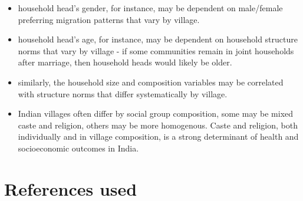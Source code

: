 \documentclass[12pt]{article}
\begin{document}
\begin{itemize}
    \item household head's gender, for instance, may be dependent on male/female preferring migration patterns that vary by village.

    \item household head's age, for instance, may be dependent on household structure norms that vary by village - if some communities remain in joint households after marriage, then household heads would likely be older. 

    \item similarly, the household size and composition variables may be correlated with structure norms that differ systematically by village.
    
    \item Indian villages often differ by social group composition, some may be mixed caste and religion, others may be more homogenous. Caste and religion, both individually and in village composition, is a strong determinant of health and socioeconomic outcomes in India.
    
\end{itemize}


\section{References used}
\end{document}
